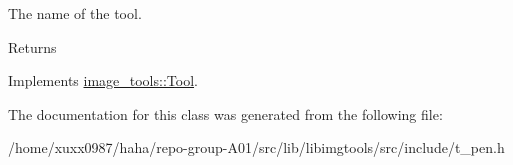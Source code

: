 The name of the tool. 

\begin{DoxyReturn}{Returns}

\end{DoxyReturn}


Implements \hyperlink{classimage__tools_1_1Tool_a251c179e3ac9756d08fbcd082750f8a9}{image\+\_\+tools\+::\+Tool}.



The documentation for this class was generated from the following file\+:\begin{DoxyCompactItemize}
\item 
/home/xuxx0987/haha/repo-\/group-\/\+A01/src/lib/libimgtools/src/include/t\+\_\+pen.\+h\end{DoxyCompactItemize}
